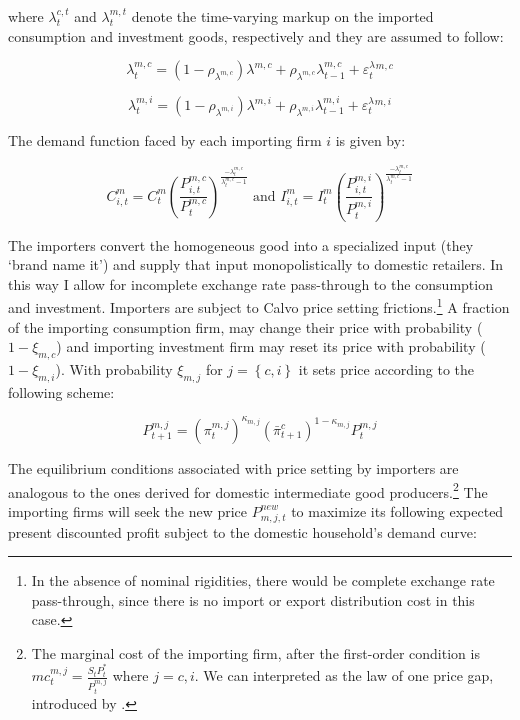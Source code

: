 \documentclass[12pt,oneside,a4paper]{article}
\begin{document}
where $\lambda_{t}^{c, t}$ and $\lambda_{t}^{m, t}$  denote the time-varying markup on the imported consumption and investment goods, respectively and they are assumed to follow:

\begin{equation}
    \lambda_{t}^{m, c}=\left(1-\rho_{\lambda^{m, c}}\right) \lambda^{m, c}+\rho_{\lambda^{m, c}} \lambda_{t-1}^{m, c}+\varepsilon_{t}^\lambda^{m, c} 
\end{equation}

\begin{equation}
    \lambda_{t}^{m, i}=\left(1-\rho_{\lambda^{m, i}}\right) \lambda^{m, i}+\rho_{\lambda^{m, i}} \lambda_{t-1}^{m, i}+\varepsilon_{t}^\lambda^{m, i}
\end{equation}

The demand function faced by each importing firm $i$ is given by:

\begin{equation}
C_{i, t}^{m}=C_{t}^{m}\left(\frac{P_{i, t}^{m, c}}{P_{t}^{m, c}}\right)^{\frac{-\lambda_{t}^{m, c}}{\lambda_{t}^{m, c}-1}}\text { and }I_{i, t}^{m}=I_{t}^{m}\left(\frac{P_{i, t}^{m, i}}{P_{t}^{m, i}}\right)^{\frac{-\lambda_{t}^{m, c}}{\lambda_{t}^{m, c}-1}}
\end{equation}

The importers convert the homogeneous good into a specialized input (they ‘brand name it’) and supply that input monopolistically to domestic retailers. In this way I allow for incomplete exchange rate pass-through to the consumption and investment. Importers are subject to Calvo price setting frictions.\footnote{In the absence of nominal rigidities, there would be complete exchange rate pass-through, since there is no import or export distribution cost in this case.} A fraction of the importing consumption firm, may change their price with probability ($1-\xi_{m,c}$) and importing investment firm may reset
its price with probability ($1-\xi_{m,i}$). With probability $\xi_{m,j}$  for $j = \left\{c,i \right\}$ it sets price according to the following scheme:

\begin{equation}
\label{Indexation_import_firm}
    P_{t+1}^{m, j}=\left(\pi_{t}^{m, j}\right)^{\kappa_{m, j}}\left(\bar{\pi}_{t+1}^{c}\right)^{1-\kappa_{m, j}} P_{t}^{m, j}    
\end{equation}


The equilibrium conditions associated with price setting by importers are analogous to the ones derived for domestic intermediate good producers.\footnote{The marginal cost of the importing firm, after the first-order condition is $m c_{t}^{m, j}=\frac{S_{t} P_{t}^{*}}{P_{t}^{m, j}}$ where $j=c, i$. We can interpreted as the law of one price gap, introduced by \citet{Monacelli:2005}.} The importing firms will seek the new price $P_{m,j,t}^{new}$ to maximize its following expected present discounted profit subject to the domestic household's demand curve: 
\end{document}
